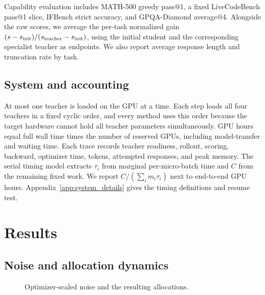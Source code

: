 Capability evaluation includes MATH-500 greedy pass@1, a fixed LiveCodeBench
pass@1 slice, IFBench strict accuracy, and GPQA-Diamond average@4.
 Alongside the raw scores, we average the
per-task normalized gain
$(s-s_{\rm init})/(s_{\rm teacher}-s_{\rm init})$, using the initial student and
the corresponding specialist teacher as endpoints. We also report average
response length and truncation rate by task.

\subsection{System and accounting}

At most one teacher is loaded on the GPU at a time. Each step loads all four
teachers in a fixed cyclic order, and every method uses this order because the
target hardware cannot hold all teacher parameters simultaneously. GPU hours
equal full wall time times the number of reserved GPUs, including model-transfer
and waiting time.
Each trace records teacher readiness, rollout, scoring, backward, optimizer
time, tokens, attempted responses, and peak memory. The serial timing model
extracts $\tau_i$ from marginal per-micro-batch time and $C$ from the remaining
fixed work. We report $C/(\sum_i m_i\tau_i)$ next to end-to-end GPU hours.
Appendix~\ref{app:system_details} gives the timing definitions and resume test.

\section{Results}
\label{sec:results}

\subsection{Noise and allocation dynamics}

\begin{figure}[H]
    \centering
    \caption{Optimizer-scaled noise and the resulting allocations.
    }
    \label{fig:allocation_dynamics}
\end{figure}

